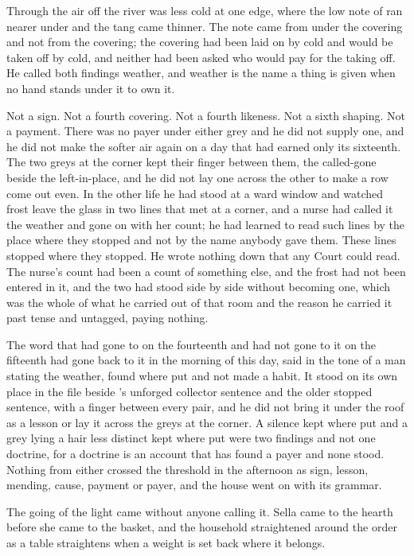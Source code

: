 Through  the air off the river was less cold at one edge, where the low note of  ran nearer under  and the tang came thinner. The note came from under the covering and not from the covering; the covering had been laid on by cold and would be taken off by cold, and neither had been asked who would pay for the taking off. He called both findings weather, and weather is the name a thing is given when no hand stands under it to own it.

Not a sign. Not a fourth covering. Not a fourth likeness. Not a sixth shaping. Not a payment. There was no payer under either grey and he did not supply one, and he did not make the softer air again on a day that had earned only its sixteenth. The two greys at the corner kept their finger between them, the called-gone beside the left-in-place, and he did not lay one across the other to make a row come out even. In the other life he had stood at a ward window and watched frost leave the glass in two lines that met at a corner, and a nurse had called it the weather and gone on with her count; he had learned to read such lines by the place where they stopped and not by the name anybody gave them. These lines stopped where they stopped. He wrote nothing down that any Court could read. The nurse's count had been a count of something else, and the frost had not been entered in it, and the two had stood side by side without becoming one, which was the whole of what he carried out of that room and the reason he carried it past tense and untagged, paying nothing.

The word that had gone to  on the fourteenth and had not gone to it on the fifteenth had gone back to it in the morning of this day, said in the tone of a man stating the weather, found where put and not made a habit. It stood on its own place in the file beside 's unforged collector sentence and the older stopped sentence, with a finger between every pair, and he did not bring it under the roof as a lesson or lay it across the greys at the corner. A silence kept where put and a grey lying a hair less distinct kept where put were two findings and not one doctrine, for a doctrine is an account that has found a payer and none stood. Nothing from either crossed the threshold in the afternoon as sign, lesson, mending, cause, payment or payer, and the house went on with its grammar.

\scenebreak

The going of the light came without anyone calling it. Sella came to the hearth before she came to the basket, and the household straightened around the order as a table straightens when a weight is set back where it belongs.

